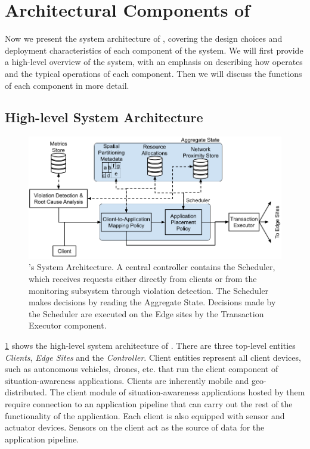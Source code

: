 \section{Architectural Components of \oneedge{}}
\label{sec:oneedge_arch}
Now we present the system architecture of \oneedge{}, covering the design choices and deployment characteristics of each component of the system. We will first provide a high-level overview of the system, with an emphasis on describing how \oneedge{} operates and the typical operations of each component. Then we will discuss the functions of each component in more detail.

\subsection{High-level System Architecture}
\begin{figure}[t]
\centering
\includegraphics[width=0.85\columnwidth]{figures/oneedge/ctrl_arch.png}
\caption{\oneedge{}'s System Architecture. A central controller contains the Scheduler, which receives requests either directly from clients or from the monitoring subsystem through violation detection. The Scheduler makes decisions by reading the Aggregate State. Decisions made by the Scheduler are executed on the Edge sites by the Transaction Executor component.}
\label{fig:system_arch}
\vspace{-2mm}
\end{figure}
\cref{fig:system_arch} shows the high-level system architecture of \oneedge{}. There are three top-level entities \textit{Clients}, \textit{Edge Sites} and the \textit{Controller}. 
Client entities represent all client devices, such as autonomous vehicles, drones, etc. that run the client component of situation-awareness applications. Clients are inherently mobile and geo-distributed. The client module of situation-awareness applications hosted by them require connection to an application pipeline that can carry out the rest of the functionality of the application. Each client is also equipped with sensor and actuator devices. Sensors on the client act as the source of data for the application pipeline. 
